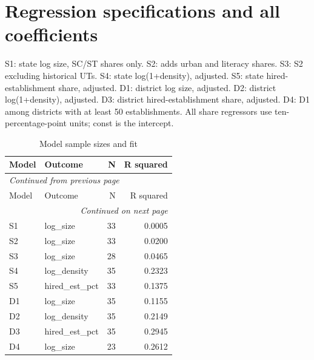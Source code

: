 \documentclass[11pt,a4paper]{report}
\begin{document}
\section{Regression specifications and all coefficients}
S1: state log size, SC/ST shares only. S2: adds urban and literacy shares. S3: S2 excluding historical UTs. S4: state log(1+density), adjusted. S5: state hired-establishment share, adjusted. D1: district log size, adjusted. D2: district log(1+density), adjusted. D3: district hired-establishment share, adjusted. D4: D1 among districts with at least 50 establishments. All share regressors use ten-percentage-point units; const is the intercept.
\begingroup\footnotesize\setlength{\tabcolsep}{4pt}
\begin{longtable}{llrr}
\caption{Model sample sizes and fit}\\\toprule
Model & Outcome & N & R squared \\\midrule\endfirsthead
\multicolumn{4}{l}{\textit{Continued from previous page}}\\\toprule
Model & Outcome & N & R squared \\\midrule\endhead
\midrule\multicolumn{4}{r}{\textit{Continued on next page}}\\\endfoot\bottomrule\endlastfoot
S1 & log\_size & 33 & 0.0005 \\
S2 & log\_size & 33 & 0.0200 \\
S3 & log\_size & 28 & 0.0465 \\
S4 & log\_density & 35 & 0.2323 \\
S5 & hired\_est\_pct & 33 & 0.1375 \\
D1 & log\_size & 35 & 0.1155 \\
D2 & log\_density & 35 & 0.2149 \\
D3 & hired\_est\_pct & 35 & 0.2945 \\
D4 & log\_size & 23 & 0.2612 \\
\end{longtable}\endgroup
\begingroup\footnotesize\setlength{\tabcolsep}{4pt}
\end{document}
